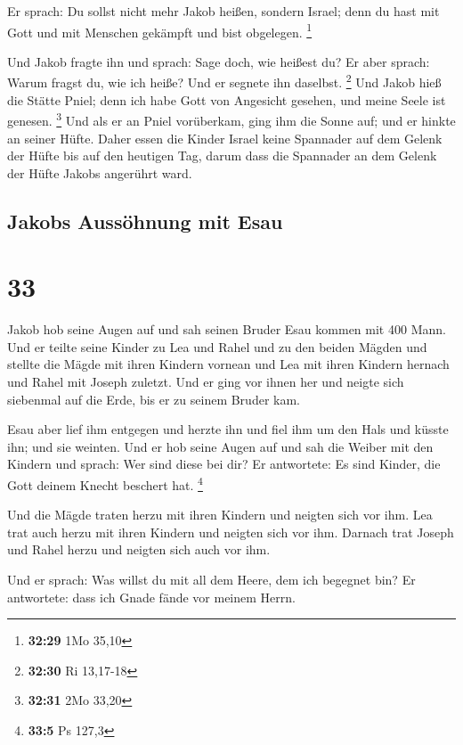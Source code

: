 Er sprach: Du sollst nicht mehr Jakob heißen, sondern
Israel; denn du hast mit Gott und mit Menschen gekämpft und bist
obgelegen. \footnote{\textbf{32:29} 1Mo 35,10}

 Und Jakob fragte ihn und sprach: Sage doch, wie heißest
du? Er aber sprach: Warum fragst du, wie ich heiße? Und er segnete ihn
daselbst. \footnote{\textbf{32:30} Ri 13,17-18}  Und
Jakob hieß die Stätte Pniel; denn ich habe Gott von Angesicht gesehen,
und meine Seele ist genesen. \footnote{\textbf{32:31} 2Mo 33,20}
 Und als er an Pniel vorüberkam, ging ihm die Sonne auf;
und er hinkte an seiner Hüfte.  Daher essen die Kinder
Israel keine Spannader auf dem Gelenk der Hüfte bis auf den heutigen
Tag, darum dass die Spannader an dem Gelenk der Hüfte Jakobs angerührt
ward.

\hypertarget{jakobs-aussuxf6hnung-mit-esau}{%
\subsection{Jakobs Aussöhnung mit
Esau}\label{jakobs-aussuxf6hnung-mit-esau}}

\hypertarget{section-32}{%
\section{33}\label{section-32}}

 Jakob hob seine Augen auf und sah seinen Bruder Esau
kommen mit 400 Mann. Und er teilte seine Kinder zu Lea und Rahel und zu
den beiden Mägden  und stellte die Mägde mit ihren Kindern
vornean und Lea mit ihren Kindern hernach und Rahel mit Joseph zuletzt.
 Und er ging vor ihnen her und neigte sich siebenmal auf
die Erde, bis er zu seinem Bruder kam.

 Esau aber lief ihm entgegen und herzte ihn und fiel ihm
um den Hals und küsste ihn; und sie weinten.  Und er hob
seine Augen auf und sah die Weiber mit den Kindern und sprach: Wer sind
diese bei dir? Er antwortete: Es sind Kinder, die Gott deinem Knecht
beschert hat. \footnote{\textbf{33:5} Ps 127,3}

 Und die Mägde traten herzu mit ihren Kindern und neigten
sich vor ihm.  Lea trat auch herzu mit ihren Kindern und
neigten sich vor ihm. Darnach trat Joseph und Rahel herzu und neigten
sich auch vor ihm.

 Und er sprach: Was willst du mit all dem Heere, dem ich
begegnet bin? Er antwortete: dass ich Gnade fände vor meinem Herrn.

